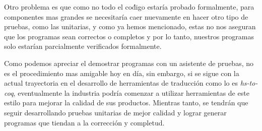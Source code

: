 Otro problema es que como no todo el co\'digo estaría probado formalmente, para componentes mas 
grandes se necesitaría caer nuevamente en hacer otro tipo de pruebas, como las unitarias, y como ya 
hemos mencionado, estas no nos aseguran que los programas sean correctos o completos y por lo tanto, 
nuestros programas solo estarían parcialmente verificados formalmente.

Como podemos apreciar el demostrar programas con un asistente de pruebas, no es el procedimiento mas 
amigable hoy en día, sin embargo, si se sigue con la actual trayectoria en el desarrollo de 
herramientas de traducci\'on como lo es \textit{hs-to-coq}, eventualmente la industria podría 
comenzar a utilizar herramientas de este estilo para mejorar la calidad de sus productos. Mientras 
tanto, se tendrán que seguir desarrollando pruebas unitarias de mejor calidad y lograr generar 
programas que tiendan a la correcci\'on y completud.
